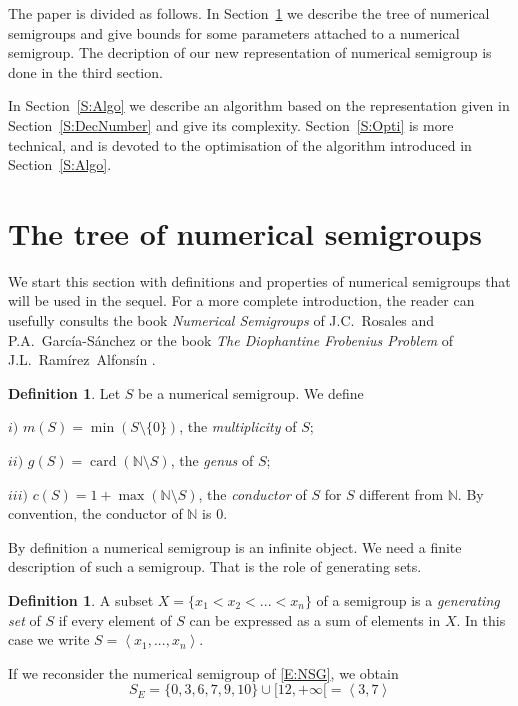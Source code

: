 \documentclass[reqno,11pt]{amsart}
\theoremstyle{plain}
\theoremstyle{definition}
\newtheorem{defi}[prop]{Definition}
\newcommand{\NN}{\mathbb{N}}
\DeclareMathOperator{\card}{card}
\newcommand{\Jean}[1]{{\color{blue}#1}}
\newcommand{\Delete}[1]{}
\begin{document}
The paper is divided as follows.
In Section~\ref{S:Tree} we describe the tree of numerical semigroups and give bounds for some parameters attached to a numerical semigroup.
\Jean{The decription of our new representation of numerical semigroup is done in the third section.}
\Delete{In Section~\ref{S:Tree} we describe a new representation of numerical semigrouos that is well suited to the construction of the tree.}
In Section~\ref{S:Algo} we describe an algorithm based on the representation given in Section~\ref{S:DecNumber} and give its complexity. 
Section~\ref{S:Opti} is more technical, and is devoted to the optimisation of the algorithm introduced in Section~\ref{S:Algo}.

\section{The tree of numerical semigroups}
\label{S:Tree}

We start this section with definitions and properties of numerical semigroups that will be used in the sequel.
For a more complete introduction, the reader can usefully consults the book \emph{Numerical Semigroups} of J.C.~Rosales and P.A.~Garc\'ia-S\'anchez \cite{BookNS} or the book \emph{The Diophantine Frobenius Problem} of J.L.~Ram\'irez~Alfons\'in \cite{BookDFP}.

\begin{defi}
Let $S$ be a numerical semigroup. We define 

$i)$ $m(S)=\min(S\setminus\{0\})$, the \emph{multiplicity} of $S$;

$ii)$ $g(S)=\card(\NN\setminus S)$, the \emph{genus} of $S$;

$iii)$ $c(S)=1+\max(\NN\setminus S)$, the \emph{conductor} of $S$ for $S$ different from $\NN$. By convention, the conductor of $\NN$ is $0$. 
\end{defi}

By definition a numerical semigroup is an infinite object. 
We need a finite description of such a semigroup. 
That is the role of generating sets.


\begin{defi}
A subset $X=\{x_1<x_2<...<x_n\}$ of a semigroup is a \emph{generating set} of $S$ if every element of $S$ can be expressed as a sum of elements in $X$. 
In this case we write $S=\left<x_1,...,x_n\right>$.
\end{defi}

If we reconsider the numerical semigroup of \eqref{E:NSG}, we obtain
\begin{equation}
\label{E:GNSG}
S_E=\{0,3,6,7,9,10\}\cup[12,+\infty[=\left<3,7\right>
\end{equation}
\end{document}
